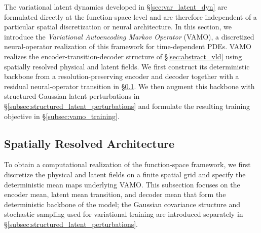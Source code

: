 \documentclass[11pt]{article}
\begin{document}
The variational latent dynamics developed in
\S\ref{sec:var_latent_dyn} are formulated directly at the function-space level and are therefore independent of a particular spatial discretization or neural architecture. In this section, we introduce the \emph{Variational Autoencoding Markov Operator} (VAMO), a discretized neural-operator realization of this framework for time-dependent PDEs. VAMO realizes the encoder-transition-decoder structure of \S\ref{sec:abstract_vld} using spatially resolved physical and latent fields. We first construct its deterministic backbone from a resolution-preserving encoder and decoder together with a residual neural-operator transition in \S\ref{subsec:vamo_architecture}. We then augment this backbone with structured Gaussian latent perturbations in \S\ref{subsec:structured_latent_perturbations} and formulate the resulting training objective in \S\ref{subsec:vamo_training}.

\subsection{Spatially Resolved Architecture}
\label{subsec:vamo_architecture}
To obtain a computational realization of the function-space framework, we first discretize the physical and latent fields on a finite spatial grid and specify the deterministic mean maps underlying VAMO. This subsection focuses on the encoder mean, latent mean transition, and decoder mean that form the deterministic backbone of the model; the Gaussian covariance structure and stochastic sampling used for variational training are introduced separately in \S\ref{subsec:structured_latent_perturbations}.
\end{document}
